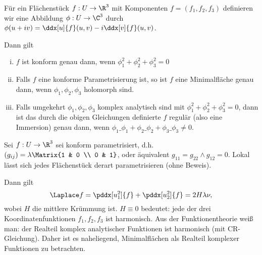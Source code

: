 \begin{kor}
	Für ein Flächenstück $f: U \to \R^3$ mit Komponenten $f = (f_1, f_2, f_3)$ definieren wir eine Abbildung $\phi: U \to \C^3$ durch $\phi(u + iv) = \ddx[u]{f}(u,v) - i \ddx[v]{f}(u,v)$.

	Dann gilt
	\begin{enumerate}[(i)]
		\item
			$f$ ist konform genau dann, wenn $\phi_1^2 + \phi_2^2 + \phi_3^2 = 0$
		\item
			Falls $f$ eine konforme Parametrisierung ist, so ist $f$ eine Minimalfläche genau dann, wenn $\phi_1, \phi_2, \phi_3$ holomorph sind.
		\item
			Falls umgekehrt $\phi_1, \phi_2, \phi_3$ komplex analytisch sind mit $\phi_1^2 + \phi_2^2 + \phi_3^2 = 0$, dann ist das durch die obigen Gleichungen definierte $f$ regulär (also eine Immersion) genau dann, wenn $\phi_1\_{\phi_1} + \phi_2\_{\phi_2} + \phi_3\_{\phi_3} \neq 0$.
	\end{enumerate}
\end{kor}


Sei $f: U \to \R^3$ sei konform parametrisiert, d.h. $(g_{ij}) = \lambda \Matrix{1 & 0 \\ 0 & 1}$, oder äquivalent $g_{11} = g_{22} \land g_{12} = 0$.
Lokal lässt sich jedes Flächenstück derart parametrisieren (ohne Beweis).

Dann gilt
\[
	\Laplace f = \pddx[u_1^2]{f} + \pddx[u_2^2]{f} = 2 H \lambda \nu,
\]
wobei $H$ die mittlere Krümmung ist.
$H \equiv 0$ bedeutet: jede der drei Koordinatenfunktionen $f_1, f_2, f_3$ ist harmonisch.
Aus der Funktionentheorie weiß man:
der Realteil komplex analytischer Funktionen ist harmonisch (mit CR-Gleichung).
Daher ist es naheliegend, Minimalflächen als Realteil komplexer Funktionen zu betrachten.

